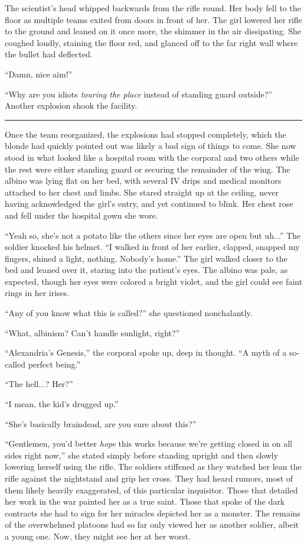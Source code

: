 \begin{Standard}
The scientist's head whipped backwards from the rifle round. Her body fell to the floor
as multiple teams exited from doors in front of her. The girl lowered her rifle to the
ground and leaned on it once more, the shimmer in the air dissipating. She coughed
loudly, staining the floor red, and glanced off to the far right wall where the bullet
had deflected.

``Damn, nice aim!''

``Why are you idiots \emph{touring the place} instead of standing guard outside?''
Another explosion shook the facility.

\fancybreak{* * *}

Once the team reorganized, the explosions had stopped completely, which the blonde
had quickly pointed out was likely a bad sign of things to come. She now stood in
what looked like a hospital room with the corporal and two others while the rest
were either standing guard or securing the remainder of the wing. The albino
was lying flat on her bed, with several IV drips and medical monitors attached
to her chest and limbs. She stared straight up at the ceiling, never having
acknowledged the girl's entry, and yet continued to blink. Her chest rose and fell
under the hospital gown she wore.

``Yeah so, she's not a potato like the others since her eyes are open but uh...''
The soldier knocked his helmet. ``I walked in front of her earlier, clapped,
snapped my fingers, shined a light, nothing. Nobody's home.'' The girl walked closer
to the bed and leaned over it, staring into the patient's eyes. The albino was pale,
as expected, though her eyes were colored a bright violet, and the girl could see
faint rings in her irises.

``Any of you know what this is called?'' she questioned nonchalantly.

``What, albinism? Can't handle sunlight, right?''

``Alexandria's Genesis,'' the corporal spoke up, deep in thought. ``A myth of a
so-called perfect being.''

``The hell...? Her?''

``I mean, the kid's drugged up.''

``She's basically braindead, are you sure about this?''

``Gentlemen, you'd better \emph{hope} this works because we're getting closed in
on all sides right now,'' she stated simply before standing upright and then slowly
lowering herself using the rifle. The soldiers stiffened as they watched her lean
the rifle against the nightstand and grip her cross. They had heard rumors, most of
them likely heavily exaggerated, of this particular inquisitor. Those that detailed
her work in the war painted her as a true saint. Those that spoke of the dark contracts
she had to sign for her miracles depicted her as a monster. The remains of the
overwhelmed platoons had so far only viewed her as another soldier, albeit a young
one. Now, they might see her at her worst.


\end{Standard}
